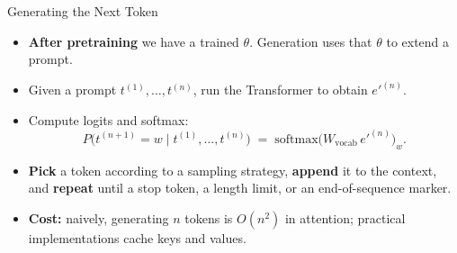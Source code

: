 \begin{frame}{Generating the Next Token}
\begin{itemize}
\item \textbf{After pretraining} we have a trained $\theta$. Generation uses that $\theta$ to extend a prompt.

\medskip
\item Given a prompt $t^{(1)}, \ldots, t^{(n)}$, run the Transformer to obtain $e'^{(n)}$.

\medskip
\item Compute logits and softmax:
\[
   P\bigl(t^{(n+1)} = w \mid t^{(1)}, \ldots, t^{(n)}\bigr) \;=\; \mathrm{softmax}\bigl(W_{\text{vocab}}\, e'^{(n)}\bigr)_{w}.
\]

\medskip
\item \textbf{Pick} a token according to a sampling strategy, \textbf{append} it to the context, and \textbf{repeat} until a stop token, a length limit, or an end-of-sequence marker.

\medskip
\item \textbf{Cost:} naively, generating $n$ tokens is $O(n^{2})$ in attention; practical implementations cache keys and values.
\end{itemize}
\end{frame}

